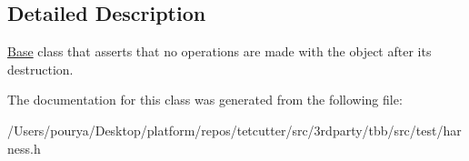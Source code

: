 \subsection{Detailed Description}
\hyperlink{structBase}{Base} class that asserts that no operations are made with the object after its destruction. 

The documentation for this class was generated from the following file\+:\begin{DoxyCompactItemize}
\item 
/\+Users/pourya/\+Desktop/platform/repos/tetcutter/src/3rdparty/tbb/src/test/harness.\+h\end{DoxyCompactItemize}
